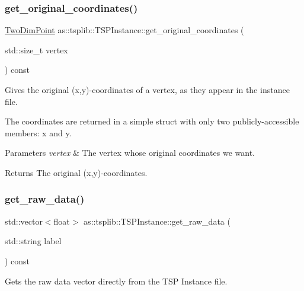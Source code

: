 \subsubsection{\texorpdfstring{get\+\_\+original\+\_\+coordinates()}{get\_original\_coordinates()}}
{\footnotesize\ttfamily \hyperlink{structas_1_1TwoDimPoint}{Two\+Dim\+Point} as\+::tsplib\+::\+T\+S\+P\+Instance\+::get\+\_\+original\+\_\+coordinates (\begin{DoxyParamCaption}\item[{std\+::size\+\_\+t}]{vertex }\end{DoxyParamCaption}) const\hspace{0.3cm}{\ttfamily [inline]}}



Gives the original (x,y)-\/coordinates of a vertex, as they appear in the instance file. 

The coordinates are returned in a simple struct with only two publicly-\/accessible members\+: x and y.


\begin{DoxyParams}{Parameters}
{\em vertex} & The vertex whose original coordinates we want. \\
\hline
\end{DoxyParams}
\begin{DoxyReturn}{Returns}
The original (x,y)-\/coordinates. 
\end{DoxyReturn}
\mbox{\label{classas_1_1tsplib_1_1TSPInstance_abba8d53e1d420920fd316f884ce2f10d}} 
\subsubsection{\texorpdfstring{get\+\_\+raw\+\_\+data()}{get\_raw\_data()}}
{\footnotesize\ttfamily std\+::vector$<$float$>$ as\+::tsplib\+::\+T\+S\+P\+Instance\+::get\+\_\+raw\+\_\+data (\begin{DoxyParamCaption}\item[{std\+::string}]{label }\end{DoxyParamCaption}) const\hspace{0.3cm}{\ttfamily [inline]}}



Gets the raw data vector directly from the T\+SP Instance file. 


